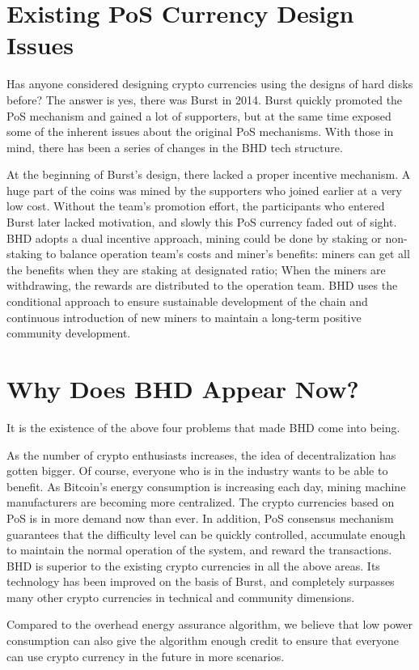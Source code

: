 \section{Existing PoS Currency Design Issues}
\begin{flushleft}
    Has anyone considered designing crypto currencies using the designs of hard disks before? The answer is yes, there was Burst in 2014. Burst quickly promoted the PoS mechanism and gained a lot of supporters, but at the same time exposed some of the inherent issues about the original PoS mechanisms. With those in mind, there has been a series of changes in the BHD tech structure.
\end{flushleft}
\begin{flushleft}
    At the beginning of Burst's design, there lacked a proper incentive mechanism. A huge part of the coins was mined by the supporters who joined earlier at a very low cost. Without the team's promotion effort, the participants who entered Burst later lacked motivation, and slowly this PoS currency faded out of sight. BHD adopts a dual incentive approach, mining could be done by staking or non-staking to balance operation team's costs and miner's benefits: miners can get all the benefits when they are staking at designated ratio; When the miners are withdrawing, the rewards are distributed to the operation team. BHD uses the conditional approach to ensure sustainable development of the chain and continuous introduction of new miners to maintain a long-term positive community development.
\end{flushleft}
\section{Why Does BHD Appear Now?}
\begin{flushleft}
    It is the existence of the above four problems that made BHD come into being.
\end{flushleft}
\begin{flushleft}
    As the number of crypto enthusiasts increases, the idea of decentralization has gotten bigger. Of course, everyone who is in the industry wants to be able to benefit. As Bitcoin's energy consumption is increasing each day, mining machine manufacturers are becoming more centralized. The crypto currencies based on PoS is in more demand now than ever. In addition, PoS consensus mechanism guarantees that the difficulty level can be quickly controlled, accumulate enough to maintain the normal operation of the system, and reward the transactions. BHD is superior to the existing crypto currencies in all the above areas. Its technology has been improved on the basis of Burst, and completely surpasses many other crypto currencies in technical and community dimensions.
\end{flushleft}
\begin{flushleft}
    Compared to the overhead energy assurance algorithm, we believe that low power consumption can also give the algorithm enough credit to ensure that everyone can use crypto currency in the future in more scenarios.
\end{flushleft}
